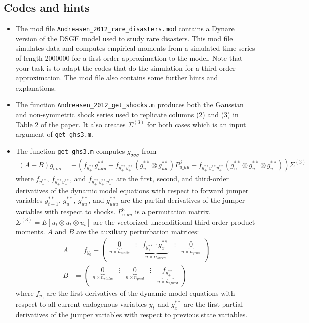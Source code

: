 \documentclass{article}
\numberwithin{equation}{section}
\begin{document}
\newpage

\subsection*{Codes and hints}

\begin{itemize}

\item
The mod file \texttt{Andreasen\_2012\_rare\_disasters.mod} contains a Dynare version of the DSGE model used to study rare disasters.
This mod file simulates data and computes empirical moments from a simulated time series of length 2000000 for a first-order approximation to the model.
Note that your task is to adapt the codes that do the simulation for a third-order approximation.
The mod file also contains some further hints and explanations.

\item
The function \texttt{Andreasen\_2012\_get\_shocks.m} produces both the Gaussian and non-symmetric shock series used to replicate columns (2) and (3) in Table 2 of the paper.
It also creates \(\Sigma^{(3)}\) for both cases which is an input argument of \texttt{get\_ghs3.m}.

\item
The function \texttt{get\_ghs3.m} computes \(g_{\sigma\sigma\sigma}\) from
\begin{align*}
(A+B) g_{\sigma\sigma\sigma} = -\left( f_{y^{**}_{+}} g^{**}_{uuu} + f_{y^{**}_{+}y^{**}_{+}} (g^{**}_u \otimes g^{**}_{uu})P^3_{u\_uu} + f_{y^{**}_{+}y^{**}_{+}y^{**}_{+}} (g^{**}_u \otimes g^{**}_u \otimes g^{**}_u)\right)\Sigma^{(3)}
\end{align*}
where \(f_{y^{**}_{+}}\), \(f_{y^{**}_{+}y^{**}_{+}}\), and \(f_{y^{**}_{+}y^{**}_{+}y^{**}_{+}}\) are the first, second, and third-order derivatives of the dynamic model equations with respect to forward jumper variables \(y_{t+1}^{**}\).
\(g^{**}_u\), \(g^{**}_{uu}\), and \(g^{**}_{uuu}\) are the partial derivatives of the jumper variables with respect to shocks.
\(P^3_{u\_uu}\) is a permutation matrix.
\(\Sigma^{(3)} = E[u_t \otimes u_t \otimes u_t]\) are the vectorized unconditional third-order product moments.
\(A\) and \(B\) are the auxiliary perturbation matrices:
\begin{align*}
A & = f_{y_0} + \begin{pmatrix} \underbrace{0}_{n\times n_{static}} &\vdots& \underbrace{f_{y^{**}_{+}} \cdot g^{**}_{x}}_{n \times n_{spred}} &\vdots& \underbrace{0}_{n\times n_{frwd}}  \end{pmatrix}\\
B & = \begin{pmatrix} \underbrace{0}_{n \times n_{static}}&\vdots & \underbrace{0}_{n \times n_{pred}} & \vdots & \underbrace{f_{y^{**}_{+}}}_{n \times n_{sfwrd}} \end{pmatrix}
\end{align*}
where \(f_{y_{0}}\) are the first derivatives of the dynamic model equations with respect to all current endogenous variables \(y_{t}^{}\)
and \(g^{**}_{x}\) are the first partial derivatives of the jumper variables with respect to previous state variables.


\end{itemize}
\end{document}
